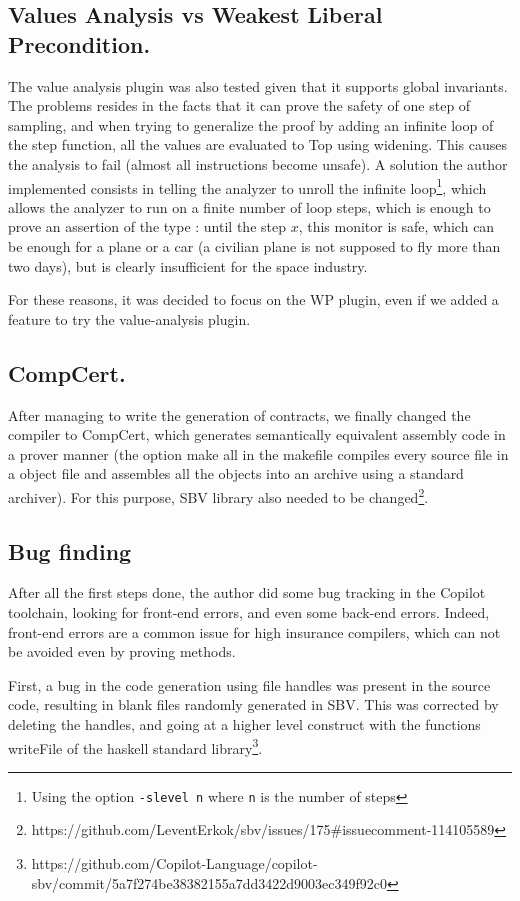 \documentclass[a4paper,11pt,final]{article}
\begin{document}
  \subsection{Values Analysis vs Weakest Liberal Precondition.}
  The value analysis plugin was also tested given that it supports global invariants. The problems resides in the facts that it can prove the safety of one step of sampling, and when trying to generalize the proof by adding an infinite loop of the step function, all the values are evaluated to Top using widening. This causes the analysis to fail (almost all instructions become unsafe). A solution the author implemented consists in telling the analyzer to unroll the infinite loop\footnote{Using the option \texttt{-slevel n} where \texttt{n} is the number of steps}, which allows the analyzer to run on a finite number of loop steps, which is enough to prove an assertion of the type : until the step $x$, this monitor is safe, which can be enough for a plane or a car (a civilian plane is not supposed to fly more than two days), but is clearly insufficient for the space industry.
  
  For these reasons, it was decided to focus on the WP plugin, even if we added a feature to try the value-analysis plugin.
  \subsection{CompCert.}
  
  After managing to write the generation of contracts, we finally changed the compiler to CompCert, which generates semantically equivalent assembly code in a prover manner (the option make all in the makefile compiles every source file in a object file and assembles all the objects into an archive using a standard archiver). For this purpose, SBV library also needed to be changed\footnote{https://github.com/LeventErkok/sbv/issues/175\#issuecomment-114105589}.
  
  \subsection{Bug finding}
  After all the first steps done, the author did some bug tracking in the Copilot toolchain, looking for front-end errors, and even some back-end errors. Indeed, front-end errors are a common issue for high insurance compilers, which can not be avoided even by proving methods\cite{bugC}. 
  
  First, a bug in the code generation using file handles was present in the source code, resulting in blank files randomly generated in SBV. This was corrected by deleting the handles, and going at a higher level construct with the functions writeFile of the haskell standard library\footnote{https://github.com/Copilot-Language/copilot-sbv/commit/5a7f274be38382155a7dd3422d9003ec349f92c0}. 
  
\end{document}
